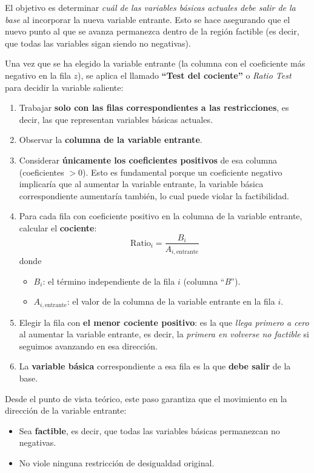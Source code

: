 El objetivo es determinar \textit{cuál de las variables básicas actuales debe salir de la base} al incorporar la nueva variable entrante. Esto se hace asegurando que el nuevo punto al que se avanza permanezca dentro de la región factible (es decir, que todas las variables sigan siendo no negativas).

Una vez que se ha elegido la variable entrante (la columna con el coeficiente más negativo en la fila \(z\)), se aplica el llamado \textbf{``Test del cociente''} o \emph{Ratio Test} para decidir la variable saliente:
\begin{enumerate}
  \item Trabajar \textbf{solo con las filas correspondientes a las restricciones},
    es decir, las que representan variables básicas actuales.
  \item Observar la \textbf{columna de la variable entrante}.
  \item Considerar \textbf{únicamente los coeficientes positivos} de esa columna
    (coeficientes \(>0\)). Esto es fundamental porque un coeficiente negativo
    implicaría que al aumentar la variable entrante, la variable básica
    correspondiente aumentaría también, lo cual puede violar la factibilidad.
  \item Para cada fila con coeficiente positivo en la columna de la variable
    entrante, calcular el \textbf{cociente}:
    \[
      \mathrm{Ratio}_i
      = \frac{B_i}{A_{i,\mathrm{entrante}}}
    \]
    donde
    \begin{itemize}
      \item \(B_i\): el término independiente de la fila \(i\) (columna ``\textit{B}'').
      \item \(A_{i,\mathrm{entrante}}\): el valor de la columna
        de la variable entrante en la fila \(i\).
    \end{itemize}
  \item Elegir la fila con \textbf{el menor cociente positivo}: es la que
    \emph{llega primero a cero} al aumentar la variable entrante, es decir,
    la \emph{primera en volverse no factible} si seguimos avanzando en esa
    dirección.
  \item La \textbf{variable básica} correspondiente a esa fila es la que
    \textbf{debe salir} de la base.
\end{enumerate}

Desde el punto de vista teórico, este paso garantiza que el movimiento en la
dirección de la variable entrante:

\begin{itemize}
  \item Sea \textbf{factible}, es decir, que todas las variables básicas
    permanezcan no negativas.
  \item No viole ninguna restricción de desigualdad original.
\end{itemize}


